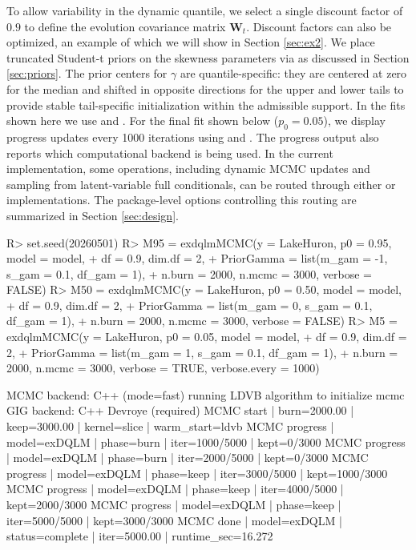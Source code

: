 \documentclass{jss}
\newcommand{\mat}[1]{\mathbf{#1}}
\begin{document}
To allow variability in the dynamic quantile, we select a single discount factor of $0.9$ to define the evolution covariance matrix $\mat{W}_t$. Discount factors can also be optimized, an example of which we will show in Section \ref{sec:ex2}. We place truncated Student-t priors on the skewness parameters via  as discussed in Section \ref{sec:priors}. The prior centers for \(\gamma\) are quantile-specific: they are centered at zero for the median and shifted in opposite directions for the upper and lower tails to provide stable tail-specific initialization within the admissible support. In the fits shown here we use  and . For the final fit shown below (\(p_0=0.05\)), we display  progress updates every 1000 iterations using  and .
The progress output also reports which computational backend is being used. In the
current implementation, some operations, including dynamic MCMC updates and sampling
from latent-variable full conditionals, can be routed through either  or
 implementations. The package-level options controlling this routing are
summarized in Section \ref{sec:design}.

\begin{CodeChunk}
\begin{CodeInput}
R> set.seed(20260501)
R> M95 = exdqlmMCMC(y = LakeHuron, p0 = 0.95, model = model,
+                 df = 0.9, dim.df = 2,
+                 PriorGamma = list(m_gam = -1, s_gam = 0.1, df_gam = 1),
+                 n.burn = 2000, n.mcmc = 3000, verbose = FALSE)
R> M50 = exdqlmMCMC(y = LakeHuron, p0 = 0.50, model = model,
+                  df = 0.9, dim.df = 2,
+                  PriorGamma = list(m_gam = 0, s_gam = 0.1, df_gam = 1),
+                  n.burn = 2000, n.mcmc = 3000, verbose = FALSE)
R> M5 = exdqlmMCMC(y = LakeHuron, p0 = 0.05, model = model,
+                 df = 0.9, dim.df = 2,
+                 PriorGamma = list(m_gam = 1, s_gam = 0.1, df_gam = 1),
+                 n.burn = 2000, n.mcmc = 3000, verbose = TRUE, verbose.every = 1000)
\end{CodeInput}

\begin{CodeOutput}
MCMC backend: C++ (mode=fast)
running LDVB algorithm to initialize mcmc
GIG backend: C++ Devroye (required)
MCMC start | burn=2000.00 | keep=3000.00 | kernel=slice | warm_start=ldvb
MCMC progress | model=exDQLM | phase=burn | iter=1000/5000 | kept=0/3000
MCMC progress | model=exDQLM | phase=burn | iter=2000/5000 | kept=0/3000
MCMC progress | model=exDQLM | phase=keep | iter=3000/5000 | kept=1000/3000
MCMC progress | model=exDQLM | phase=keep | iter=4000/5000 | kept=2000/3000
MCMC progress | model=exDQLM | phase=keep | iter=5000/5000 | kept=3000/3000
MCMC done | model=exDQLM | status=complete | iter=5000.00 | runtime_sec=16.272
\end{CodeOutput}
\end{CodeChunk}
\end{document}
